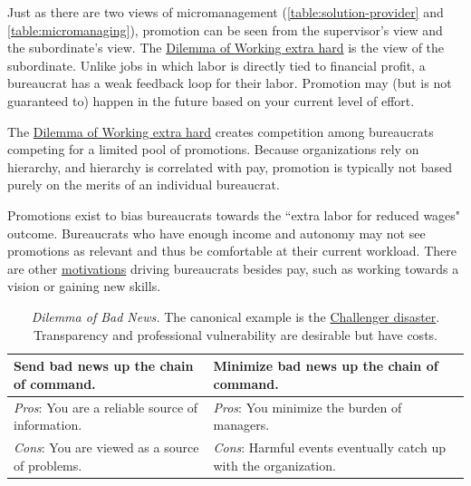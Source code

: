Just as there are two views of micromanagement (\ref{table:solution-provider} and \ref{table:micromanaging}), promotion can be seen from the supervisor's view and the subordinate's view. The \hyperref[table:work-extra-or-work-as-expected]{Dilemma of Working extra hard} is the view of the subordinate. Unlike jobs in which labor is directly tied to financial profit, a bureaucrat has a weak feedback loop for their labor. Promotion may (but is not guaranteed to) happen in the future based on your current level of effort. 

The \hyperref[table:work-extra-or-work-as-expected]{Dilemma of Working extra hard} creates competition among bureaucrats competing for a limited pool of promotions. Because organizations rely on hierarchy, and hierarchy is correlated with pay, promotion is typically not based purely on the merits of an individual bureaucrat. 

Promotions exist to bias bureaucrats towards the ``extra labor for reduced wages" outcome. Bureaucrats who have enough income and autonomy may not see promotions as relevant and thus be comfortable at their current workload. There are other \hyperref[sec:motivations]{motivations} driving bureaucrats besides pay, such as working towards a vision or gaining new skills. 

\begin{center}
\begin{table}[H] %
\begin{tabular}{ | m{\dilemmatablewidth}| m{\dilemmatablewidth} | } 
  \hline
  \textbf{Send bad news up the chain of command.} &
  \textbf{Minimize bad news up the chain of command.} \\
  \hline
  \textit{Pros}: You are a reliable source of information. &
  \textit{Pros}: You minimize the burden of managers. \\
  \hline
  \textit{Cons}: You are viewed as a source of problems. & 
  \textit{Cons}: Harmful events eventually catch up with the organization.  \\
  \hline
\end{tabular}
\caption{\textit{Dilemma of Bad News.}
The canonical example is the \href{https://en.wikipedia.org/wiki/Space_Shuttle_Challenger_disaster}{Challenger disaster}. 
Transparency and professional vulnerability are desirable but have costs.}
\label{table:bad-news-up-the-chain}
\end{table}
\end{center}

